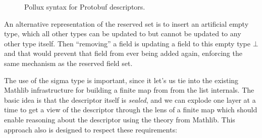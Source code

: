\begin{figure}[H]
  \centering
  \begin{syntax}

    \alternative{\double}
    \alternative{\float}
    \alternative{\ints}
    \alternative{\intl}
    \groupleft{
        \alternative{\uints}
        \alternative{\uintl}
        \alternative{\sints}
        \alternative{\sintl}
    }
    \groupleft{
      \alternative{\fixeds}
      \alternative{\fixedl}
      \alternative{\sfixeds}
      \alternative{\sfixedl}
    }
    \groupleft{
      \alternative{\bool}
      \alternative{\str}
      \alternative{\byt}
    }

    \alternative{\sig}
    \alternative{\opt}
    \alternative{\rep}


    \alternative{\texttt{[]}}


  \end{syntax}
  \caption{Pollux syntax for Protobuf descriptors.}\label{fig:proto-desc-syn}
\end{figure}

An alternative representation of the reserved set is to insert an artificial
empty type, which all other types can be updated to but cannot be updated to any
other type itself. Then ``removing'' a field is updating a field to this empty
type $\bot$ and that would prevent that field from ever being added again,
enforcing the same mechanism as the reserved field set.

The use of the sigma type is important, since it let's us tie into the existing
Mathlib infrastructure for building a finite map from from the list
internals. The basic idea is that the descriptor itself is \emph{sealed}, and we
can explode one layer at a time to get a view of the descriptor through the lens
of a finite map which should enable reasoning about the descriptor using the
theory from Mathlib. This approach also is designed to respect these
requirements:

